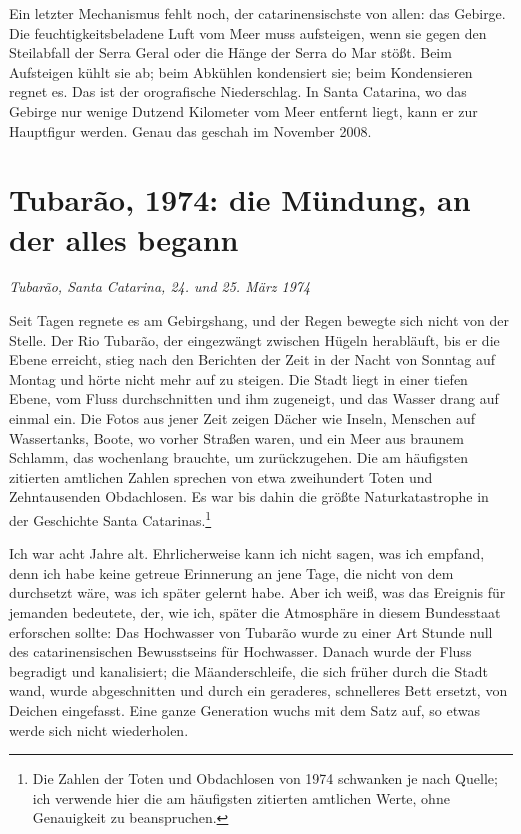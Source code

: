 \documentclass[
  ngerman,
  11pt,
  openany]{book}
\begin{document}
Ein letzter Mechanismus fehlt noch, der catarinensischste von allen: das
Gebirge. Die feuchtigkeitsbeladene Luft vom Meer muss aufsteigen, wenn
sie gegen den Steilabfall der Serra Geral oder die Hänge der Serra do
Mar stößt. Beim Aufsteigen kühlt sie ab; beim Abkühlen kondensiert sie;
beim Kondensieren regnet es. Das ist der orografische Niederschlag. In
Santa Catarina, wo das Gebirge nur wenige Dutzend Kilometer vom Meer
entfernt liegt, kann er zur Hauptfigur werden. Genau das geschah im
November 2008.

\section{Tubarão, 1974: die Mündung, an der alles
begann}\label{tubaruxe3o-1974-die-muxfcndung-an-der-alles-begann}

\emph{Tubarão, Santa Catarina, 24. und 25. März 1974}

Seit Tagen regnete es am Gebirgshang, und der Regen bewegte sich nicht
von der Stelle. Der Rio Tubarão, der eingezwängt zwischen Hügeln
herabläuft, bis er die Ebene erreicht, stieg nach den Berichten der Zeit
in der Nacht von Sonntag auf Montag und hörte nicht mehr auf zu steigen.
Die Stadt liegt in einer tiefen Ebene, vom Fluss durchschnitten und ihm
zugeneigt, und das Wasser drang auf einmal ein. Die Fotos aus jener Zeit
zeigen Dächer wie Inseln, Menschen auf Wassertanks, Boote, wo vorher
Straßen waren, und ein Meer aus braunem Schlamm, das wochenlang
brauchte, um zurückzugehen. Die am häufigsten zitierten amtlichen Zahlen
sprechen von etwa zweihundert Toten und Zehntausenden Obdachlosen. Es
war bis dahin die größte Naturkatastrophe in der Geschichte Santa
Catarinas.\footnote{Die Zahlen der Toten und Obdachlosen von 1974
  schwanken je nach Quelle; ich verwende hier die am häufigsten
  zitierten amtlichen Werte, ohne Genauigkeit zu beanspruchen.}

Ich war acht Jahre alt. Ehrlicherweise kann ich nicht sagen, was ich
empfand, denn ich habe keine getreue Erinnerung an jene Tage, die nicht
von dem durchsetzt wäre, was ich später gelernt habe. Aber ich weiß, was
das Ereignis für jemanden bedeutete, der, wie ich, später die Atmosphäre
in diesem Bundesstaat erforschen sollte: Das Hochwasser von Tubarão
wurde zu einer Art Stunde null des catarinensischen Bewusstseins für
Hochwasser. Danach wurde der Fluss begradigt und kanalisiert; die
Mäanderschleife, die sich früher durch die Stadt wand, wurde
abgeschnitten und durch ein geraderes, schnelleres Bett ersetzt, von
Deichen eingefasst. Eine ganze Generation wuchs mit dem Satz auf, so
etwas werde sich nicht wiederholen.
\end{document}
